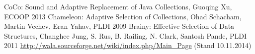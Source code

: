 \documentclass[12pt,headsepline,abstract=on]{scrreprt}
\begin{document}







\begin{thebibliography}{99}
   CoCo: Sound and Adaptive Replacement of Java Collections, Guoqing Xu, ECOOP 2013
   Chameleon: Adaptive Selection of Collections, Ohad Schacham, Martin Vechev, Eran Yahav, PLDI 2009
   Brainy: Effective Selection of Data Structures, Changhee Jung, S. Rus, B. Railing, N. Clark, Santosh Pande, PLDI 2011
   \url{http://wala.sourceforge.net/wiki/index.php/Main_Page} (Stand 10.11.2014)
\end{thebibliography}
\end{document}
